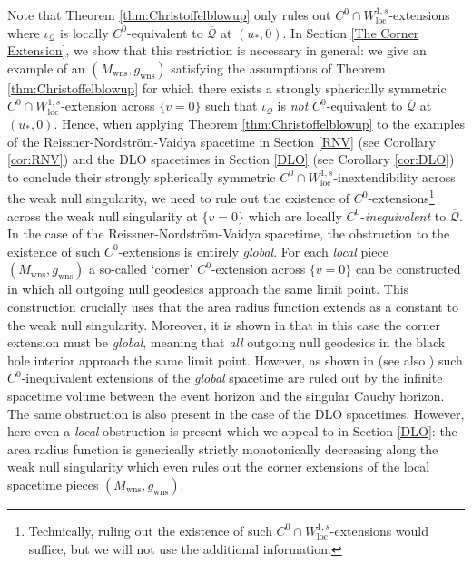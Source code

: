 \documentclass{article}
\newcommand{\Q}{\mathcal{Q}}
\newcommand{\loc}{\mathrm{loc}}
\newcommand{\Mw}{M_{\mathrm{wns}}}
\newcommand{\gw}{g_{\mathrm{wns}}}
\begin{document}
 Note that Theorem \ref{thm:Christoffelblowup} only rules out $C^0 \cap W^{1,s}_{\loc}$-extensions where $\iota_\Q$ is locally $C^0$-equivalent to $\overline{\Q}$ at $(u_*,0)$. 
In Section \ref{The Corner Extension}, we show that this restriction is necessary in general: we give an example of an $(\Mw, \gw)$ satisfying the assumptions of Theorem \ref{thm:Christoffelblowup} for which there exists a strongly spherically symmetric $C^0 \cap W^{1,s}_{\loc}$-extension across $\{v=0\}$ such that $\iota_\Q$ is \emph{not} $C^0$-equivalent to $\overline{\Q}$ at $(u_*,0)$. Hence, when applying Theorem \ref{thm:Christoffelblowup} to the examples of the Reissner-Nordstr\"om-Vaidya spacetime in Section \ref{RNV} (see Corollary \ref{cor:RNV})  and the DLO spacetimes in Section \ref{DLO} (see Corollary \ref{cor:DLO}) to conclude their strongly spherically symmetric $C^0 \cap W^{1,s}_{\loc}$-inextendibility across the weak null singularity, we need to rule out the existence of $C^0$-extensions\footnote{Technically, ruling out the existence of such $C^0 \cap W^{1,s}_{\loc}$-extensions would suffice, but we will not use the additional information.} across the weak null singularity at $\{v=0\}$ which are locally $C^0$-\emph{inequivalent} to $\overline{\Q}$. In the case of the Reissner-Nordstr\"om-Vaidya spacetime, the obstruction to the existence of such $C^0$-extensions is entirely \emph{global}. For each \emph{local} piece $(\Mw, \gw)$ a so-called `corner' $C^0$-extension across $\{v=0\}$ can be constructed in which all outgoing null geodesics approach the same limit point. This construction crucially uses that the area radius function extends as a constant to the weak null singularity. Moreover, it is shown in \cite[Theorem 4.3]{CameronSbierski} that in this case the corner extension must be \textit{global}, meaning that \textit{all} outgoing null geodesics in the black hole interior approach the same limit point. However, as shown in \cite[Proposition 4.4]{CameronSbierski} (see also \cite[Corollary 4.6]{CameronSbierski}) such $C^0$-inequivalent extensions of the \emph{global} spacetime are ruled out by the infinite spacetime volume between the event horizon and the singular Cauchy horizon. The same obstruction is also present in the case of the DLO spacetimes. However, here even a \emph{local} obstruction is present which we appeal to in Section \ref{DLO}: the area radius function is generically strictly monotonically decreasing along the weak null singularity which even rules out the corner extensions of the local spacetime pieces $(\Mw, \gw)$.
\end{document}
